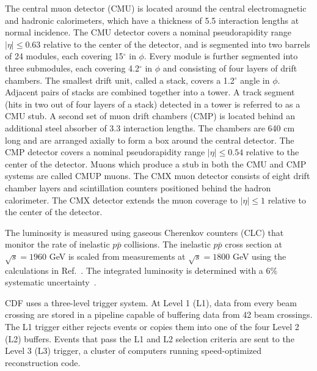 \documentclass[aps,prd,preprint,floatfix,nofootinbib,superscriptaddress,showpacs,amssymb]{revtex4}
\begin{document}
 The central muon detector (CMU) is located around the central electromagnetic
 and hadronic calorimeters, which have a thickness of 5.5 interaction lengths
 at normal incidence. The CMU detector covers a nominal pseudorapidity range
 $|\eta| \leq 0.63$ relative to the center of the detector, and  is segmented
 into two barrels of 24 modules, each covering 15$^\circ$ in $\phi$. Every
 module is further segmented  into three  submodules, each covering
 4.2$^\circ$ in $\phi$ and consisting of four layers of drift chambers.
 The smallest drift unit, called a stack, covers a 1.2$^\circ$ angle in
 $\phi$. Adjacent pairs of stacks are combined together into a tower.
 A track segment (hits in two out of four layers of a stack) detected in
 a tower is referred to as a CMU stub. A second set of muon drift chambers
 (CMP) is located behind an additional steel absorber of 3.3 interaction
 lengths. The chambers are 640 cm long and are arranged axially to form a
 box around the central detector. The CMP detector covers a nominal
 pseudorapidity range $|\eta| \leq 0.54$ relative to the center of the
 detector. Muons which produce a stub in both the CMU and CMP systems are
 called CMUP muons. The CMX muon detector consists of eight drift chamber
 layers and scintillation counters positioned behind the hadron calorimeter.
 The CMX detector extends the muon coverage to $|\eta| \leq 1$ relative to
 the center of the detector.

 The luminosity is measured using gaseous Cherenkov counters (CLC) that
 monitor the rate of inelastic $p\bar{p}$ collisions. The inelastic 
 $p\bar{p}$ cross section at $\sqrt{s}=1960$ GeV is scaled from measurements
 at $\sqrt{s}=1800$ GeV using the calculations in Ref.~\cite{sigmatot}.
 The integrated luminosity is determined with a 6\% systematic
 uncertainty~\cite{klimen}.
 
 CDF uses a three-level trigger system. At Level 1 (L1), data from every
 beam crossing are stored in a pipeline capable of buffering data from 42
 beam crossings. The L1 trigger either rejects events or copies them into
 one of the four Level 2 (L2) buffers. Events that pass the L1 and L2 
 selection criteria are sent to the Level 3 (L3) trigger, a cluster of
 computers running  speed-optimized reconstruction code.  
\end{document}
